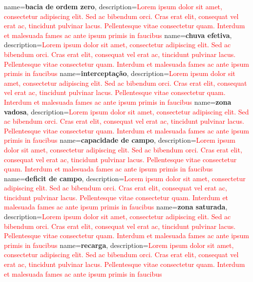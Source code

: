 {
    name=\textbf{bacia de ordem zero},
    description={\textcolor{red}{Lorem ipsum dolor sit amet, consectetur adipiscing elit. Sed ac bibendum orci. Cras erat elit, consequat vel erat ac, tincidunt pulvinar lacus. Pellentesque vitae consectetur quam. Interdum et malesuada fames ac ante ipsum primis in faucibus}}
}
{
    name=\textbf{chuva efetiva},
    description={\textcolor{red}{Lorem ipsum dolor sit amet, consectetur adipiscing elit. Sed ac bibendum orci. Cras erat elit, consequat vel erat ac, tincidunt pulvinar lacus. Pellentesque vitae consectetur quam. Interdum et malesuada fames ac ante ipsum primis in faucibus}}
}
{
    name=\textbf{interceptação},
    description={\textcolor{red}{Lorem ipsum dolor sit amet, consectetur adipiscing elit. Sed ac bibendum orci. Cras erat elit, consequat vel erat ac, tincidunt pulvinar lacus. Pellentesque vitae consectetur quam. Interdum et malesuada fames ac ante ipsum primis in faucibus}}
}
{
    name=\textbf{zona vadosa},
    description={\textcolor{red}{Lorem ipsum dolor sit amet, consectetur adipiscing elit. Sed ac bibendum orci. Cras erat elit, consequat vel erat ac, tincidunt pulvinar lacus. Pellentesque vitae consectetur quam. Interdum et malesuada fames ac ante ipsum primis in faucibus}}
}
{
    name=\textbf{capacidade de campo},
    description={\textcolor{red}{Lorem ipsum dolor sit amet, consectetur adipiscing elit. Sed ac bibendum orci. Cras erat elit, consequat vel erat ac, tincidunt pulvinar lacus. Pellentesque vitae consectetur quam. Interdum et malesuada fames ac ante ipsum primis in faucibus}}
}
{
    name=\textbf{deficit de campo},
    description={\textcolor{red}{Lorem ipsum dolor sit amet, consectetur adipiscing elit. Sed ac bibendum orci. Cras erat elit, consequat vel erat ac, tincidunt pulvinar lacus. Pellentesque vitae consectetur quam. Interdum et malesuada fames ac ante ipsum primis in faucibus}}
}
{
    name=\textbf{zona saturada},
    description={\textcolor{red}{Lorem ipsum dolor sit amet, consectetur adipiscing elit. Sed ac bibendum orci. Cras erat elit, consequat vel erat ac, tincidunt pulvinar lacus. Pellentesque vitae consectetur quam. Interdum et malesuada fames ac ante ipsum primis in faucibus}}
}
{
    name=\textbf{recarga},
    description={\textcolor{red}{Lorem ipsum dolor sit amet, consectetur adipiscing elit. Sed ac bibendum orci. Cras erat elit, consequat vel erat ac, tincidunt pulvinar lacus. Pellentesque vitae consectetur quam. Interdum et malesuada fames ac ante ipsum primis in faucibus}}
}
